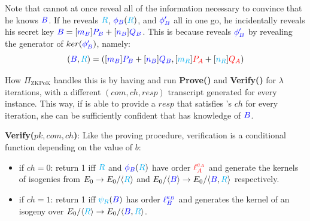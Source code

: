 \begin{center}
\end{center}

Note that \bob cannot at once reveal all of the information necessary to convince \alice that he knows $\textcolor{blue}{B}$. If he reveals $\textcolor{cyan}{R}$, $\textcolor{blue}{\phi_B}(\textcolor{cyan}{R})$, and $\textcolor{blue}{\phi'_B}$ all in one go, he incidentally reveals his secret key $\textcolor{blue}{B} = [\textcolor{blue}{m_B}]\textcolor{blue}{P_B} + [\textcolor{blue}{n_B}]\textcolor{blue}{Q_B}$. This is because \bob reveals $\textcolor{blue}{\phi'_B}$ by revealing the generator of $ker(\textcolor{blue}{\phi'_B})$, namely:
$$
(\textcolor{blue}{B}, \textcolor{cyan}{R}) = ([\textcolor{blue}{m_B}]\textcolor{blue}{P_B} + [\textcolor{blue}{n_B}]\textcolor{blue}{Q_B}, [\textcolor{cyan}{m_R}]\textcolor{red}{P_A} + [\textcolor{cyan}{n_R}]\textcolor{red}{Q_A})
$$

How $\Pi_{\text{ZKPoK}}$ handles this is by having \bob and \alice run \textbf{Prove()} and \textbf{Verify()} for $\lambda$ iterations, with a different $(com, ch, resp)$ transcript generated for every instance. This way, if \bob is able to provide a $resp$ that satisfies \alice's $ch$ for every iteration, she can be sufficiently confident that \bob has knowledge of $\textcolor{blue}{B}$.

\noindent
\textbf{Verify($pk, com, ch$)}: Like the proving procedure, verification is a conditional function depending on the value of $b$:
\begin{itemize}
\item if $ch = 0$: return 1 iff $\textcolor{cyan}{R}$ and $\textcolor{blue}{\phi_B}(\textcolor{cyan}{R})$ have order $\textcolor{red}{\ell_{A}^{e_A}}$ and generate the kernels of isogenies from $E_0 \rightarrow E_0/\langle \textcolor{cyan}{R} \rangle$ and $E_0/\langle \textcolor{blue}{B} \rangle \rightarrow E_0/\langle \textcolor{blue}{B}, \textcolor{cyan}{R} \rangle$ respectively.
\item if $ch = 1$: return 1 iff $\textcolor{cyan}{\psi_R}(\textcolor{blue}{B})$ has order $\textcolor{blue}{\ell_{B}^{e_B}}$ and generates the kernel of an isogeny over $E_0/\langle \textcolor{cyan}{R} \rangle \rightarrow E_0/\langle \textcolor{blue}{B}, \textcolor{cyan}{R} \rangle$.
\end{itemize}

